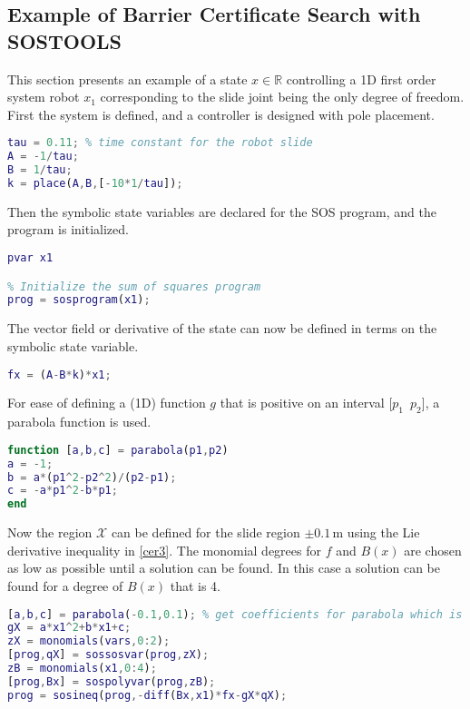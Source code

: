 \subsection{Example of Barrier Certificate Search with SOSTOOLS}
This section presents an example of a state $x\in\mathbb{R}$ controlling a 1D first order system robot $x_1$ corresponding to the slide joint being the only degree of freedom. First the system is defined, and a controller is designed with pole placement.
\begin{lstlisting}[language=matlab]
% Define state-space system with x1 = robot position
tau = 0.11; % time constant for the robot slide
A = -1/tau;
B = 1/tau;
k = place(A,B,[-10*1/tau]);
\end{lstlisting}
Then the symbolic state variables are declared for the SOS program, and the program is initialized.
\begin{lstlisting}[language=matlab]
% Declare state variables
pvar x1

% Initialize the sum of squares program
prog = sosprogram(x1);
\end{lstlisting}
The vector field or derivative of the state can now be defined in terms on the symbolic state variable.
\begin{lstlisting}[language=matlab]
% Vector field dx/dt = fx (closed loop)
fx = (A-B*k)*x1;
\end{lstlisting}
For ease of defining a (1D) function $g$ that is positive on an interval [$p_1\,\,\, p_2$], a parabola function is used.
\begin{lstlisting}[language=matlab]
function [a,b,c] = parabola(p1,p2)
a = -1;
b = a*(p1^2-p2^2)/(p2-p1);
c = -a*p1^2-b*p1;
end
\end{lstlisting}
Now the region $\mathcal{X}$ can be defined for the slide region $\pm0.1$\,m using the Lie derivative inequality in \autoref{cer3}. The monomial degrees for $f$ and $B(x)$ are chosen as low as possible until a solution can be found. In this case a solution can be found for a degree of $B(x)$ that is 4.
\begin{lstlisting}[language=matlab]
% Define space X in R^n
[a,b,c] = parabola(-0.1,0.1); % get coefficients for parabola which is positive for x in [-0.1,0.1]
gX = a*x1^2+b*x1+c;
zX = monomials(vars,0:2);
[prog,qX] = sossosvar(prog,zX);
zB = monomials(x1,0:4);
[prog,Bx] = sospolyvar(prog,zB);
prog = sosineq(prog,-diff(Bx,x1)*fx-gX*qX);
\end{lstlisting}
